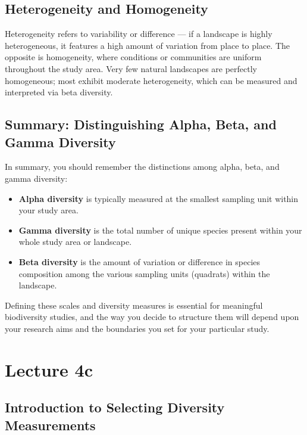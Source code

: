 \documentclass[
  11pt,
]{book}
\providecommand{\tightlist}{%
  \setlength{\itemsep}{0pt}\setlength{\parskip}{0pt}}
\begin{document}
\section{Heterogeneity and
Homogeneity}\label{heterogeneity-and-homogeneity}

Heterogeneity refers to variability or difference --- if a landscape is
highly heterogeneous, it features a high amount of variation from place
to place. The opposite is homogeneity, where conditions or communities
are uniform throughout the study area. Very few natural landscapes are
perfectly homogeneous; most exhibit moderate heterogeneity, which can be
measured and interpreted via beta diversity.

\section{Summary: Distinguishing Alpha, Beta, and Gamma
Diversity}\label{summary-distinguishing-alpha-beta-and-gamma-diversity}

In summary, you should remember the distinctions among alpha, beta, and
gamma diversity:

\begin{itemize}
\tightlist
\item
  \textbf{Alpha diversity} is typically measured at the smallest
  sampling unit within your study area.
\item
  \textbf{Gamma diversity} is the total number of unique species present
  within your whole study area or landscape.
\item
  \textbf{Beta diversity} is the amount of variation or difference in
  species composition among the various sampling units (quadrats) within
  the landscape.
\end{itemize}

Defining these scales and diversity measures is essential for meaningful
biodiversity studies, and the way you decide to structure them will
depend upon your research aims and the boundaries you set for your
particular study.

\chapter*{Lecture 4c}\label{lecture-4c}

\section{Introduction to Selecting Diversity
Measurements}\label{introduction-to-selecting-diversity-measurements}
\end{document}
